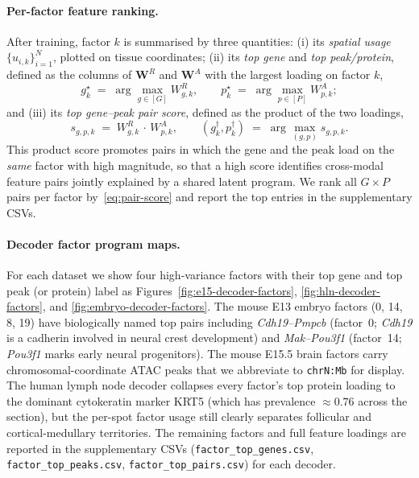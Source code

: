 \documentclass{article}
\theoremstyle{plain}
\theoremstyle{definition}
\begin{document}
\paragraph{Per-factor feature ranking.}
After training, factor $k$ is summarised by three quantities: (i) its \emph{spatial usage} $\{u_{i,k}\}_{i=1}^{N}$, plotted on tissue coordinates; (ii) its \emph{top gene} and \emph{top peak/protein}, defined as the columns of $\mathbf{W}^{R}$ and $\mathbf{W}^{A}$ with the largest loading on factor $k$,
\begin{equation}\label{eq:top-feature}
    g^{\star}_k \;=\; \arg\max_{g \in [G]} W^{R}_{g,k},
    \qquad
    p^{\star}_k \;=\; \arg\max_{p \in [P]} W^{A}_{p,k};
\end{equation}
and (iii) its \emph{top gene--peak pair score}, defined as the product of the two loadings,
\begin{equation}\label{eq:pair-score}
    s_{g,p,k} \;=\; W^{R}_{g,k}\,\cdot\,W^{A}_{p,k},
    \qquad
    (g^{\dagger}_k, p^{\dagger}_k) \;=\; \arg\max_{(g,p)} s_{g,p,k}.
\end{equation}
This product score promotes pairs in which the gene and the peak load on the \emph{same} factor with high magnitude, so that a high score identifies cross-modal feature pairs jointly explained by a shared latent program. We rank all $G\!\times\!P$ pairs per factor by~\eqref{eq:pair-score} and report the top entries in the supplementary CSVs.

\paragraph{Decoder factor program maps.}
For each dataset we show four high-variance factors with their top gene and top peak (or protein) label as Figures~\ref{fig:e15-decoder-factors}, \ref{fig:hln-decoder-factors}, and \ref{fig:embryo-decoder-factors}. The mouse E13 embryo factors (0, 14, 8, 19) have biologically named top pairs including \emph{Cdh19--Pmpcb} (factor~0; \emph{Cdh19} is a cadherin involved in neural crest development) and \emph{Mak--Pou3f1} (factor~14; \emph{Pou3f1} marks early neural progenitors). The mouse E15.5 brain factors carry chromosomal-coordinate ATAC peaks that we abbreviate to \texttt{chrN:Mb} for display. The human lymph node decoder collapses every factor's top protein loading to the dominant cytokeratin marker KRT5 (which has prevalence $\approx 0.76$ across the section), but the per-spot factor usage still clearly separates follicular and cortical-medullary territories. The remaining factors and full feature loadings are reported in the supplementary CSVs (\texttt{factor\_top\_genes.csv}, \texttt{factor\_top\_peaks.csv}, \texttt{factor\_top\_pairs.csv}) for each decoder.
\end{document}
